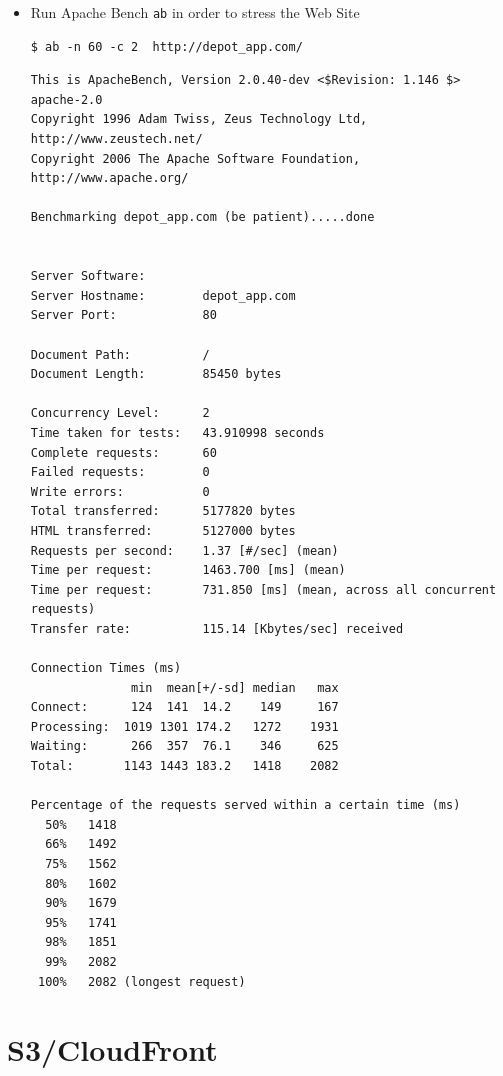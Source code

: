 \documentclass{beamer}
\begin{document}
\begin{frame}
\begin{itemize}
\item Run Apache Bench \texttt{ab} in order to stress the Web Site

\lstset{language=shell}
\begin{lstlisting}[escapechar=!]
$ ab -n 60 -c 2  http://depot_app.com/
\end{lstlisting}


\lstset{language=shell}
\begin{lstlisting}[escapechar=!]
This is ApacheBench, Version 2.0.40-dev <$Revision: 1.146 $> apache-2.0
Copyright 1996 Adam Twiss, Zeus Technology Ltd, http://www.zeustech.net/
Copyright 2006 The Apache Software Foundation, http://www.apache.org/

Benchmarking depot_app.com (be patient).....done


Server Software:
Server Hostname:        depot_app.com
Server Port:            80

Document Path:          /
Document Length:        85450 bytes

Concurrency Level:      2
Time taken for tests:   43.910998 seconds
Complete requests:      60
Failed requests:        0
Write errors:           0
Total transferred:      5177820 bytes
HTML transferred:       5127000 bytes
Requests per second:    1.37 [#/sec] (mean)
Time per request:       1463.700 [ms] (mean)
Time per request:       731.850 [ms] (mean, across all concurrent requests)
Transfer rate:          115.14 [Kbytes/sec] received

Connection Times (ms)
              min  mean[+/-sd] median   max
Connect:      124  141  14.2    149     167
Processing:  1019 1301 174.2   1272    1931
Waiting:      266  357  76.1    346     625
Total:       1143 1443 183.2   1418    2082

Percentage of the requests served within a certain time (ms)
  50%   1418
  66%   1492
  75%   1562
  80%   1602
  90%   1679
  95%   1741
  98%   1851
  99%   2082
 100%   2082 (longest request)

\end{lstlisting}


\end{itemize}

\end{frame}

\section{S3/CloudFront}
\end{document}
